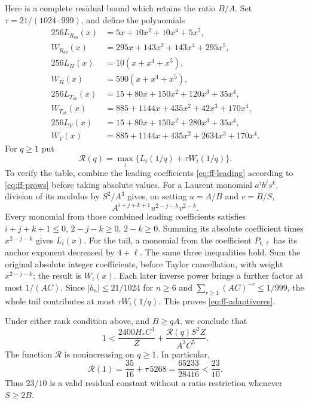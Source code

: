 \documentclass[12pt]{article}
\numberwithin{equation}{section}
\begin{document}
Here is a complete residual bound which retains the ratio $B/A$.
Set $\tau=21/(1024\cdot999)$, and define the polynomials
\[
\begin{aligned}
 256L_{R_{ab}}(x)&=5x+10x^2+10x^4+5x^5,\\
 W_{R_{ab}}(x)&=295x+143x^2+143x^4+295x^5,\\
 256L_H(x)&=10(x+x^4+x^5),\\
 W_H(x)&=590(x+x^4+x^5),\\
 256L_{T_{ab}}(x)&=15+80x+150x^2+120x^3+35x^4,\\
 W_{T_{ab}}(x)&=885+1144x+435x^2+42x^3+170x^4,\\
 256L_V(x)&=15+80x+150x^2+280x^3+35x^4,\\
 W_V(x)&=885+1144x+435x^2+2634x^3+170x^4.
\end{aligned}
\]
For $q\ge1$ put
\begin{equation}\label{eq:ff-adaptiveres}
 \mathcal R(q)=\max_i\{L_i(1/q)+\tau W_i(1/q)\}.
\end{equation}
To verify the table, combine the leading coefficients
\eqref{eq:ff-leading} according to \eqref{eq:ff-prows} before taking
absolute values. For a Laurent monomial $a^ib^js^k$, division of its
modulus by $S^2/A^3$ gives, on setting $u=A/B$ and $v=B/S$,
\[
 A^{i+j+k+1}u^{2-j-k}v^{2-k}.
\]
Every monomial from those combined leading coefficients satisfies
$i+j+k+1\le0$, $2-j-k\ge0$, $2-k\ge0$.
Summing its absolute coefficient times $x^{2-j-k}$ gives $L_i(x)$.
For the tail, a monomial from the coefficient $P_{t,\ell}$ has its
anchor exponent decreased by $4+\ell$. The same three inequalities
hold. Sum the original absolute integer coefficients, before Taylor
cancellation, with weight $x^{2-j-k}$; the result is $W_i(x)$.
Each later inverse power brings a further factor at most $1/(AC)$.
Since $|b_n|\le21/1024$ for $n\ge6$ and
$\sum_{r\ge1}(AC)^{-r}\le1/999$, the whole tail contributes at most
$\tau W_i(1/q)$. This proves \eqref{eq:ff-adaptiveres}.

Under either rank condition above, and $B\ge qA$, we conclude that
\begin{equation}\label{eq:ff-P}
 1<\frac{2400H_*C^3}{Z}
       +\frac{\mathcal R(q)S^2Z}{A^3C^5}.
\end{equation}
The function $\mathcal R$ is nonincreasing on $q\ge1$.
In particular,
\[
 \mathcal R(1)=\frac{35}{16}+\tau\,5268
              =\frac{65233}{28416}<\frac{23}{10}.
\]
Thus $23/10$ is a valid residual constant without a ratio restriction
whenever $S\ge2B$.
\end{document}
